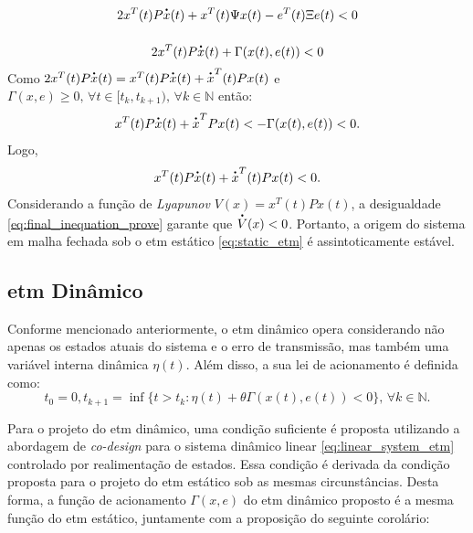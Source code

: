 \begin{gather}
  2x^T(t) P\dt{x}(t) + x^T(t)\Psi x(t) - e^T(t) \Xi e(t)  < 0 \notag \\[12pt]
  2x^T(t) P\dt{x}(t) + \Gamma(x(t), e(t)) < 0
  \label{eq:inequation_prove_4}
\end{gather} Como $2x^T(t) P\dt{x}(t) = x^T(t) P\dt{x}(t) + \dt{x}^T(t) P x(t)$ e $\Gamma(x, e) \geq 0, \, \forall t \in [t_k, t_{k+1}), \, \forall k \in \mathbb{N}$ então: \begin{equation}
  x^T(t) P\dt{x}(t) + \dt{x}^T P x(t)  < - \Gamma(x(t), e(t)) < 0.
\end{equation} Logo, \begin{equation}
  x^T(t) P\dt{x}(t) + \dt{x}^T(t) P x(t) < 0.
  \label{eq:final_inequation_prove}
\end{equation} Considerando a função de \textit{Lyapunov} $V(x) = x^T(t)Px(t)$, a desigualdade \eqref{eq:final_inequation_prove} garante que $\dt{V}(x) < 0$. Portanto, a origem do sistema em malha fechada sob o \acrshort{etm} estático \eqref{eq:static_etm} é assintoticamente estável.

\subsection{\acrshort{etm} Dinâmico}

Conforme mencionado anteriormente, o \acrshort{etm} dinâmico opera considerando não apenas os estados atuais do sistema e o erro de transmissão, mas também uma variável interna dinâmica $\eta(t)$. Além disso, a sua lei de acionamento é definida como: \begin{equation}
  t_0 = 0, t_{k+1} = \inf \{t > t_k : \eta(t) + \theta \Gamma(x(t), e(t)) < 0 \}, \, \forall k \in \mathbb{N} \label{eq:dynamic_etm}.
\end{equation}

Para o projeto do \acrshort{etm} dinâmico, uma condição suficiente é proposta utilizando a abordagem de \textit{co-design} para o sistema dinâmico linear \eqref{eq:linear_system_etm} controlado por realimentação de estados. Essa condição é derivada da condição proposta para o projeto do \acrshort{etm} estático sob as mesmas circunstâncias. Desta forma, a função de acionamento $\Gamma(x, e)$ do \acrshort{etm} dinâmico proposto é a mesma função do \acrshort{etm} estático, juntamente com a proposição do seguinte corolário:

